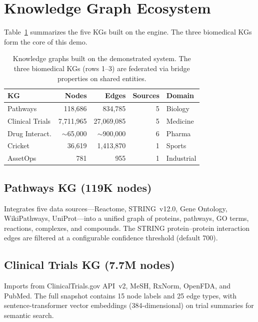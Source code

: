 \documentclass[sigconf]{acmart}
\begin{document}
\section{Knowledge Graph Ecosystem}\label{sec:kgs}

Table~\ref{tab:kgs} summarizes the five KGs built on the engine.
The three biomedical KGs form the core of this demo.

\begin{table}[t]
\centering
\caption{Knowledge graphs built on the demonstrated system.
  The three biomedical KGs (rows 1--3) are federated via bridge
  properties on shared entities.}
\label{tab:kgs}
\small
\begin{tabular}{@{}lrrrl@{}}
\toprule
\textbf{KG} & \textbf{Nodes} & \textbf{Edges} & \textbf{Sources} & \textbf{Domain} \\
\midrule
Pathways        & 118,686 &    834,785 &  5 & Biology \\
Clinical Trials & 7,711,965 & 27,069,085 &  5 & Medicine \\
Drug Interact.  & ${\sim}$65,000 & ${\sim}$900,000 &  6 & Pharma \\
\midrule
Cricket         &  36,619 &  1,413,870 &  1 & Sports \\
AssetOps        &     781 &        955 &  1 & Industrial \\
\bottomrule
\end{tabular}
\end{table}

\subsection{Pathways KG (119K nodes)}
Integrates five data sources---Reactome, STRING~v12.0, Gene Ontology,
WikiPathways, UniProt---into a unified graph of proteins, pathways,
GO terms, reactions, complexes, and compounds.  The STRING
protein--protein interaction edges are filtered at a configurable
confidence threshold (default 700).

\subsection{Clinical Trials KG (7.7M nodes)}
Imports from ClinicalTrials.gov API~v2, MeSH, RxNorm, OpenFDA, and
PubMed.  The full snapshot contains 15 node labels and 25 edge types,
with sentence-transformer vector embeddings (384-dimensional) on trial
summaries for semantic search.
\end{document}
